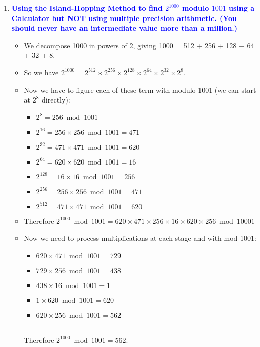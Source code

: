 \documentclass[11pt]{article}
\begin{document}
\begin{enumerate}
\item \textbf{\textcolor{blue}{Using the Island-Hopping Method to find $2^{1000}$ modulo $1001$ using a Calculator but NOT using multiple precision arithmetic. (You should never have an intermediate value more than a million.)}}
    \begin{itemize}
        \item We decompose 1000 in powers of 2, giving 1000 = 512 + 256 + 128 + 64 + 32 + 8.
        \item So we have $2^{1000} = 2^{512} \times 2^{256} \times 2^{128} \times 2^{64} \times 2^{32} \times 2^8$.
        \item Now we have to figure each of these term with modulo 1001 (we can start at $2^8$ directly):
        \begin{itemize}[label={***}]
            \item $2^{8} = 256 \bmod{1001}$
            \item $2^{16} = 256 \times 256 \bmod{1001} = 471$
            \item $2^{32} = 471 \times 471 \bmod{1001} = 620$
            \item $2^{64} = 620 \times 620 \bmod{1001} = 16$
            \item $2^{128} = 16 \times 16 \bmod{1001} = 256$
            \item $2^{256} = 256 \times 256 \bmod{1001} = 471$
            \item $2^{512} = 471 \times 471 \bmod{1001} = 620$
        \end{itemize}
        \item Therefore $2^{1000} \bmod{1001} = 620 \times 471 \times 256 \times 16 \times 620 \times 256 \bmod{10001}$
        \item Now we need to process multiplications at each stage and with mod 1001:
        \begin{itemize}[label={***}]
            \item $620 \times 471 \bmod{1001} = 729$
            \item $729 \times 256 \bmod{1001} = 438$
            \item $438 \times 16 \bmod{1001} = 1$
            \item $1 \times 620 \bmod{1001} = 620$
            \item $620 \times 256 \bmod{1001} = 562$          
        \end{itemize}
        \\ Therefore $2^{1000} \bmod{1001} = 562$.
    \end{itemize}




\end{enumerate}
\end{document}
